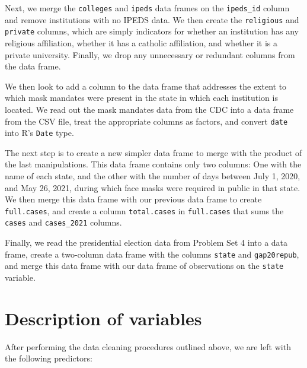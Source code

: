 \documentclass[
]{article}
\begin{document}
Next, we merge the \texttt{colleges} and \texttt{ipeds} data frames on
the \texttt{ipeds\_id} column and remove institutions with no IPEDS
data. We then create the \texttt{religious} and \texttt{private}
columns, which are simply indicators for whether an institution has any
religious affiliation, whether it has a catholic affiliation, and
whether it is a private university. Finally, we drop any unnecessary or
redundant columns from the data frame.

We then look to add a column to the data frame that addresses the extent
to which mask mandates were present in the state in which each
institution is located. We read out the mask mandates data from the CDC
into a data frame from the CSV file, treat the appropriate columns as
factors, and convert \texttt{date} into R's \texttt{Date} type.

The next step is to create a new simpler data frame to merge with the
product of the last manipulations. This data frame contains only two
columns: One with the name of each state, and the other with the number
of days between July 1, 2020, and May 26, 2021, during which face masks
were required in public in that state. We then merge this data frame
with our previous data frame to create \texttt{full.cases}, and create a
column \texttt{total.cases} in \texttt{full.cases} that sums the
\texttt{cases} and \texttt{cases\_2021} columns.

Finally, we read the presidential election data from Problem Set 4 into
a data frame, create a two-column data frame with the columns
\texttt{state} and \texttt{gap20repub}, and merge this data frame with
our data frame of observations on the \texttt{state} variable.

\hypertarget{description-of-variables}{%
\section{Description of variables}\label{description-of-variables}}

After performing the data cleaning procedures outlined above, we are
left with the following predictors:
\end{document}
